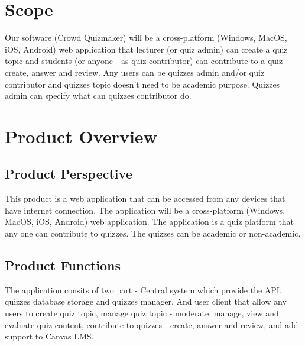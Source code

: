 \documentclass[ 10pt]{report}
\begin{document}
        \section{Scope}
        Our software (Crowd Quizmaker) will be a cross-platform (Windows, MacOS, iOS, Android) web application that lecturer (or quiz admin) can create a quiz topic and students (or anyone - as quiz contributor) can contribute to a quiz - create, answer and review. Any users can be quizzes admin and/or quiz contributor and quizzes topic doesn't need to be academic purpose. Quizzes admin can specify what can quizzes contributor do.
        \section{Product Overview}
            \subsection{Product Perspective}
            This product is a web application that can be accessed from any devices that have internet connection. The application will be a cross-platform (Windows, MacOS, iOS, Android) web application. The application is a quiz platform that any one can contribute to quizzes. The quizzes can be academic or non-academic.
            \subsection{Product Functions}
            The application consits of two part - Central system which provide the API, quizzes database storage and quizzes manager. And user client that allow any users to create quiz topic, manage quiz topic - moderate, manage, view and evaluate quiz content, contribute to quizzes - create, answer and review, and add support to Canvas LMS.
\end{document}
